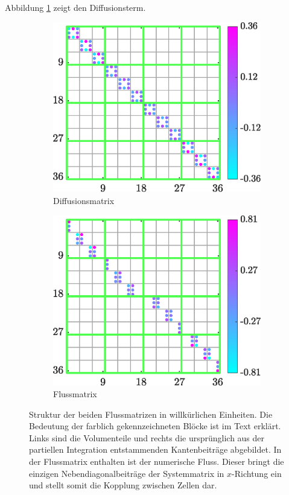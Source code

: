 Abbildung \ref{fig:matrix_L} zeigt den Diffusionsterm.
\begin{figure}
    \centering
    \begin{subfigure}[b]{0.475\textwidth}
        \centering
        \includegraphics[width=\textwidth]{plots/L_glob.eps}
        \caption[]%
        {{\small Diffusionsmatrix}}
        \label{fig:matrix_L}
    \end{subfigure}
    \hfill
    \begin{subfigure}[b]{0.475\textwidth}
        \centering
        \includegraphics[width=\textwidth]{plots/F_glob.eps}
        \caption[]%
        {{\small Flussmatrix}}
        \label{fig:matrix_F}
    \end{subfigure}
    \caption[]
    {Struktur der beiden Flussmatrizen in willkürlichen Einheiten. Die Bedeutung der farblich gekennzeichneten Blöcke ist im Text erklärt. Links sind die Volumenteile und rechts die ursprünglich aus der partiellen Integration entstammenden Kantenbeiträge abgebildet. In der Flussmatrix enthalten ist der numerische Fluss. Dieser bringt die einzigen Nebendiagonalbeiträge der Systemmatrix in $x$-Richtung ein und stellt somit die Kopplung zwischen Zellen dar.}
\end{figure}
